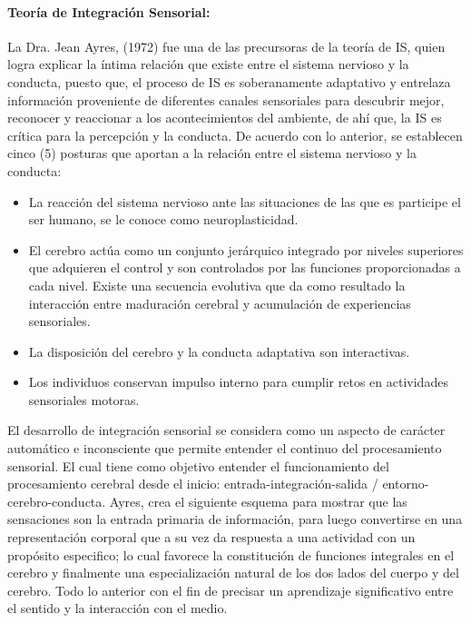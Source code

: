     \paragraph{Teoría de Integración Sensorial:}
    La Dra. Jean Ayres, (1972) fue una de las precursoras de la teoría de IS, quien logra explicar la íntima relación que existe entre el sistema nervioso y la conducta, puesto que, el proceso de IS es soberanamente adaptativo y entrelaza información proveniente de diferentes canales sensoriales para descubrir mejor, reconocer y reaccionar a los acontecimientos del ambiente, de ahí que, la IS es crítica para la percepción y la conducta. 
    De acuerdo con lo anterior, se establecen cinco (5) posturas que aportan a la relación entre el sistema nervioso y la conducta:  
    \begin{itemize}
    \item La reacción del sistema nervioso ante las situaciones de las que es participe el ser humano, se le conoce como neuroplasticidad. 
    \item El cerebro actúa como un conjunto jerárquico integrado por niveles superiores que adquieren el control y son controlados por las funciones proporcionadas a cada nivel. 
    Existe una secuencia evolutiva que da como resultado la interacción entre maduración cerebral y acumulación de experiencias sensoriales. 
    \item La disposición del cerebro y la conducta adaptativa son interactivas.
    \item Los individuos conservan impulso interno para cumplir retos en actividades sensoriales motoras.
    \end{itemize}
    El desarrollo de integración sensorial se considera como un aspecto de carácter automático e inconsciente que permite entender el continuo del procesamiento sensorial. El cual tiene como objetivo entender el funcionamiento del procesamiento cerebral desde el inicio: entrada-integración-salida / entorno-cerebro-conducta. 
    Ayres, crea el siguiente esquema para mostrar que las sensaciones son la entrada primaria de información, para luego convertirse en una representación corporal que a su vez da respuesta a una actividad con un propósito especifico; lo cual favorece la constitución de funciones integrales en el cerebro y finalmente una especialización natural de los dos lados del cuerpo y del cerebro. Todo lo anterior con el fin de precisar un aprendizaje significativo entre el sentido y la interacción con el medio.
